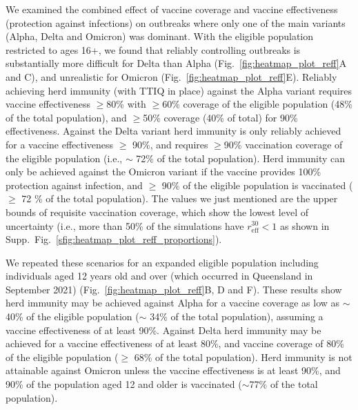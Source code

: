 \documentclass[article, a4, authoryear]{elsarticle}
\begin{document}
We examined the combined effect of vaccine coverage and vaccine effectiveness (protection against infections) on outbreaks where only one of the main variants (Alpha, Delta and Omicron) was dominant. With the eligible population restricted to ages 16+, we found that reliably controlling outbreaks is substantially more difficult for Delta than Alpha (Fig.~\ref{fig:heatmap_plot_reff}A and C), and unrealistic for Omicron (Fig.~\ref{fig:heatmap_plot_reff}E). Reliably achieving herd immunity (with TTIQ in place) against the Alpha variant requires vaccine effectiveness $\ge$80\% with $\ge$60\% coverage of the eligible population (48\% of the total population), and $\ge$50\% coverage (40\% of total) for 90\% effectiveness. Against the Delta variant herd immunity is only reliably achieved for a vaccine effectiveness $\ge$ 90\%, and requires $\ge$90\% vaccination coverage of the eligible population (i.e., $\sim$ 72\% of the total population). Herd immunity can only be achieved against the Omicron variant if the vaccine provides 100\% protection against infection, and $\ge$ 90\% of the eligible population is vaccinated ($\ge$ 72 \% of the total population). The values we just mentioned are the upper bounds of requisite vaccination coverage, which show the lowest level of uncertainty (i.e., more than 50\% of the simulations have $r_{\mathrm{eff}}^{30} < 1$ as shown in Supp.~Fig.~\ref{sfig:heatmap_plot_reff_proportions}).  

We repeated these scenarios for an expanded eligible population including individuals aged 12 years old and over (which occurred in Queensland in September 2021) (Fig.~\ref{fig:heatmap_plot_reff}B, D and F). These results show herd immunity may be achieved against Alpha for a vaccine coverage as low as $\sim$40\% of the eligible population ($\sim$ 34\% of the total population), assuming a vaccine effectiveness of at least 90\%. Against Delta herd immunity may be achieved for a vaccine effectiveness of at least 80\%, and vaccine coverage of 80\% of the eligible population ($\geq$ 68\% of the total population). Herd immunity is not attainable against Omicron unless the vaccine effectiveness is at least 90\%, and 90\% of the population aged 12 and older is vaccinated ($\sim$77\% of the total population).
\end{document}
